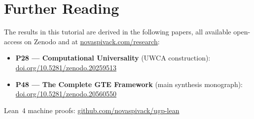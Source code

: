 \documentclass[11pt,a4paper]{article}
\begin{document}
\section*{Further Reading}
\begin{tcolorbox}[colback=orange!8,colframe=orange!50!black,
  title=\textbf{Primary Sources}]
The results in this tutorial are derived in the following papers,
all available open-access on Zenodo and at
\href{https://novaspivack.com/research}{novaspivack.com/research}:
\begin{itemize}
  \item \textbf{P28 --- Computational Universality} (UWCA construction):\\
        \href{https://doi.org/10.5281/zenodo.20259513}{doi.org/10.5281/zenodo.20259513}
  \item \textbf{P48 --- The Complete GTE Framework} (main synthesis monograph):\\
        \href{https://doi.org/10.5281/zenodo.20560550}{doi.org/10.5281/zenodo.20560550}
\end{itemize}
Lean~4 machine proofs: \href{https://github.com/novaspivack/ugp-lean}{github.com/novaspivack/ugp-lean}
\end{tcolorbox}


\end{document}
